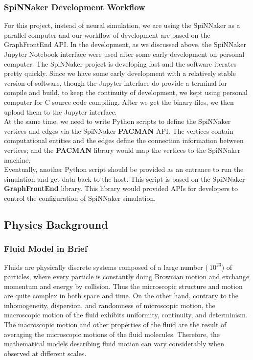 \subsubsection{SpiNNaker Development Workflow} \label{sec:sdw}

For this project, instead of neural simulation, we are using the SpiNNaker as a parallel computer and our workflow of development are based on the GraphFrontEnd API. In the development, as we discussed above, the SpiNNaker Jupyter Notebook interface were used after some early development on personal computer. The SpiNNaker project is developing fast and the software iterates pretty quickly. Since we have some early development with a relatively stable version of software, though the Jupyter interface do provide a terminal for compile and build, to keep the continuity of development, we kept using personal computer for C source code compiling. After we get the binary files, we then upload them to the Jupyter interface. \\

At the same time, we need to write Python scripts to define the SpiNNaker vertices and edges via the SpiNNaker \textbf{PACMAN} API. The vertices contain computational entities and the edges define the connection information between vertices; and the \textbf{PACMAN} library would map the vertices to the SpiNNaker machine.\\

Eventually, another Python script should be provided as an entrance to run the simulation and get data back to the host. This script is based on the SpiNNaker \textbf{GraphFrontEnd} library. This library would provided APIs for developers to control the configuration of SpiNNaker simulation.\\



\subsection{Physics Background} \label{sec:PB}

\subsubsection{Fluid Model in Brief}
Fluids are physically discrete systems composed of a large number ($~10^{23}$) of particles, where every particle is constantly doing Brownian motion and exchange momentum and energy by collision. Thus the microscopic structure and motion are quite complex in both space and time. On the other hand, contrary to the inhomogeneity, dispersion, and randomness of microscopic motion, the macroscopic motion of the fluid exhibits uniformity, continuity, and determinism. The macroscopic motion and other properties of the fluid are the result of averaging the microscopic motions of the fluid molecules. Therefore, the mathematical models describing fluid motion can vary considerably when observed at different scales.\\

